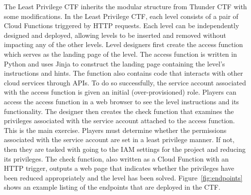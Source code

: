 The Least Privilege CTF inherits the modular structure from Thunder CTF with some modifications.  In the Least Privilege CTF, each level consists of a pair of Cloud Functions triggered by HTTP requests.  Each level can be independently designed and deployed, allowing levels to be inserted and removed without impacting any of the other levels.
Level designers first create the access function which serves as the landing page of the level.  The access function is written in Python and uses Jinja
to construct the landing page containing the level's instructions and hints.    The function also contains code that interacts with other cloud services through APIs.
To do so successfully, the service account associated with the access function is given an initial (over-provisioned) role.  Players can access the access
function in a web browser to see the level instructions and its functionality.
The designer then creates the check function that examines the privileges associated with the service account attached to the access
function.  This is the main exercise.  Players must determine whether the permissions associated with the service account are set in a least privilege manner.
If not, then they are tasked with going to the IAM settings for the project and reducing its privileges.  The check function, also written as a Cloud Function
with an HTTP trigger, outputs a web page that indicates whether the privileges have been reduced appropriately and the level has been solved.  Figure~\ref{fig:endpoints}
shows an example listing of the endpoints that are deployed in the CTF.

